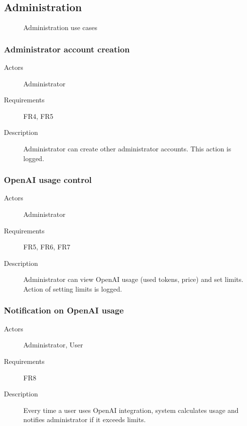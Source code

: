 \documentclass[
    english, %
]{VUMIFPSkursinis}
\begin{document}
\subsection{Administration}

\begin{figure}[ht]
    \centering
    
    \label{administration-use-cases}
    \caption{Administration use cases}
\end{figure}

\subsubsection{Administrator account creation}

\begin{description}
    \item[Actors] Administrator
    \item[Requirements] FR4, FR5
    \item[Description] Administrator can create other administrator accounts. This action is logged.
\end{description}

\subsubsection{OpenAI usage control}

\begin{description}
    \item[Actors] Administrator
    \item[Requirements] FR5, FR6, FR7
    \item[Description] Administrator can view OpenAI usage (used tokens, price) and set limits. Action of setting limits is logged.
\end{description}

\subsubsection{Notification on OpenAI usage}

\begin{description}
    \item[Actors] Administrator, User
    \item[Requirements] FR8
    \item[Description] Every time a user uses OpenAI integration, system calculates usage and notifies administrator if it exceeds limits.
\end{description}
\end{document}
